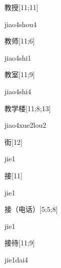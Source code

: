 \begin{verbete}{教授}[11;11]
\begin{pronuncia}{jiao4shou4}
\end{pronuncia}
\end{verbete}

\begin{verbete}{教师}[11;6]
\begin{pronuncia}{jiao4shi1}
\end{pronuncia}
\end{verbete}

\begin{verbete}{教室}[11;9]
\begin{pronuncia}{jiao4shi4}
\end{pronuncia}
\end{verbete}

\begin{verbete}{教学楼}[11;8;13]
\begin{pronuncia}{jiao4xue2lou2}
\end{pronuncia}
\end{verbete}

\begin{verbete}[jie1]{街}[12]
\begin{pronuncia}{jie1}
\end{pronuncia}
\end{verbete}

\begin{verbete}[jie1]{接}[11]
\begin{pronuncia}{jie1}
\end{pronuncia}
\end{verbete}

\begin{verbete}[jie1]{接（电话）}[5;5;8]
\begin{pronuncia}{jie1}
\end{pronuncia}
\end{verbete}

\begin{verbete}{接待}[11;9]
\begin{pronuncia}{jie1dai4}
\end{pronuncia}
\end{verbete}

